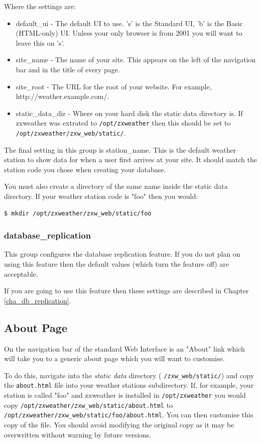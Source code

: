 \documentclass[a4paper,10pt,draft]{book}
\begin{document}
Where the settings are:
\begin{itemize}
\item default\_ui - The default UI to use. 's' is the Standard UI, 'b' is the Basic (HTML-only) UI. Unless your only browser is from 2001 you will want to leave this on 's'.
\item site\_name - The name of your site. This appears on the left of the navigation bar and in the title of every page.
\item site\_root - The URL for the root of your website. For example, http://weather.example.com/.
\item static\_data\_dir - Where on your hard disk the static data directory is. If zxweather was extrated to \verb|/opt/zxweather| then this should be set to \verb|/opt/zxweather/zxw_web/static/|.
\end{itemize}

The final setting in this group is station\_name. This is the default weather station to show data for when a user first arrives at your site. It should match the station code you chose when creating your database.

You must also create a directory of the same name inside the static data directory. If your weather station code is "foo" then you would:
\begin{verbatim}
$ mkdir /opt/zxweather/zxw_web/static/foo
\end{verbatim}

\subsubsection{database\_replication}
This group configures the database replication feature. If you do not plan on using this feature then the default values (which turn the feature off) are acceptable.

If you are going to use this feature then these settings are described in Chapter \ref{cha_db_replication}.

\subsection{About Page}
On the navigation bar of the standard Web Interface is an "About" link which will take you to a generic about page which you will want to customise.

To do this, navigate into the \emph{static data} directory ( \verb|/zxw_web/static/|) and copy the \verb|about.html| file into your weather stations subdirectory. If, for example, your station is called "foo" and zxweather is installed in \verb|/opt/zxweather| you would copy \verb|/opt/zxweather/zxw_web/static/about.html| to \\ \verb|/opt/zxweather/zxw_web/static/foo/about.html|. You can then customise this copy of the file. You should avoid modifying the original copy as it may be overwritten without warning by future versions.
\end{document}
